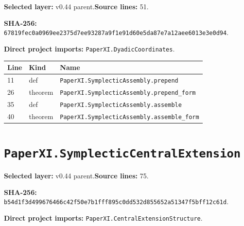 \documentclass[10pt,oneside]{book}
\begin{document}
\textbf{Selected layer:} v0.44 parent.\quad\textbf{Source lines:} 51.\par\textbf{SHA-256:} {\scriptsize\nolinkurl{67819fec0a0969ee2375d7ee93287a9f1e91d60e5da87e7a12aee6013e3e0d94}}.


\textbf{Direct project imports:} \nolinkurl{PaperXI.DyadicCoordinates}.

\begin{longtable}{@{}p{}p{}p{}@{}}\toprule Line&Kind&Name\\\midrule\endhead

11&def&\nolinkurl{PaperXI.SymplecticAssembly.prepend}\\

26&theorem&\nolinkurl{PaperXI.SymplecticAssembly.prepend_form}\\

35&def&\nolinkurl{PaperXI.SymplecticAssembly.assemble}\\

40&theorem&\nolinkurl{PaperXI.SymplecticAssembly.assemble_form}\\

\bottomrule\end{longtable}

\section{\texorpdfstring{\nolinkurl{PaperXI.SymplecticCentralExtension}}{PaperXI.SymplecticCentralExtension}}\label{module:PaperXI.SymplecticCentralExtension}

\textbf{Selected layer:} v0.44 parent.\quad\textbf{Source lines:} 75.\par\textbf{SHA-256:} {\scriptsize\nolinkurl{b54d1f3d499676466c42f50e7b1fff895c0dd532d855652a51347f5bff12c61d}}.


\textbf{Direct project imports:} \nolinkurl{PaperXI.CentralExtensionStructure}.
\end{document}

